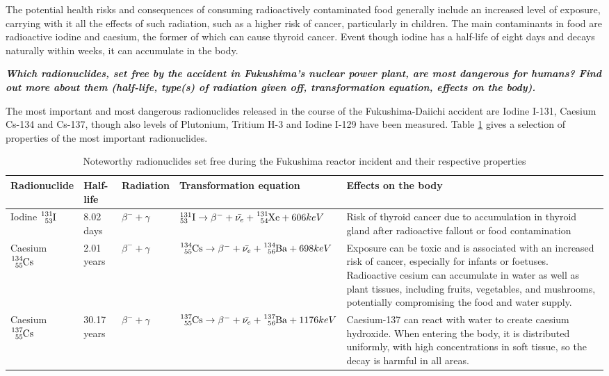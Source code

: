 The potential health risks and consequences of consuming radioactively contaminated food generally include an increased level of exposure, carrying with it all the effects of such radiation, such as a higher risk of cancer, particularly in children. The main contaminants in food are radioactive iodine and caesium, the former of which can cause thyroid cancer. Event though iodine has a half-life of eight days and decays naturally within weeks, it can accumulate in the body. 

\pagebreak

\textbf{\emph{Which radionuclides, set free by the accident in Fukushima's nuclear power plant, are most dangerous for humans? Find out more about them (half-life, type(s) of radiation given off, transformation equation, effects on the body).}}

The most important and most dangerous radionuclides released in the course of the Fukushima-Daiichi accident are Iodine I-131, Caesium Cs-134 and Cs-137, though also levels of Plutonium, Tritium H-3 and Iodine I-129 have been measured. Table \ref{tbl:nuclides} gives a selection of properties of the most important radionuclides.

\begin{table}[b!]
\centering
	\begin{tabular}{| p{2.5cm} | l | p{2cm} | p{3cm} | p{4cm} |}
		\hline 
		\rowcolor[gray]{0.8}
		Radionuclide & Half-life & Radiation & Transformation equation & Effects on the body
		\\ \hline
		Iodine $\ce{^{131}_{53}I}$ & 8.02 days & $\beta^- + \gamma$ & ${^{131}_{53}\ce{I}} \rightarrow \beta^- + \bar{\nu_e} + \ce{^{131}_{54}Xe}  + 606 keV$ & Risk of thyroid cancer due to accumulation in thyroid gland after radioactive fallout or food contamination
		\\ \hline
		Caesium $\ce{^{134}_{55}Cs}$ & 2.01 years & $\beta^- + \gamma$ & $ \ce{^{134}_{55}Cs} \rightarrow \beta^- + \bar{\nu_{e}} + \ce{^{134}_{56}Ba} + 698 keV$ & Exposure can be toxic and is associated with an increased risk of cancer, especially for infants or foetuses. Radioactive cesium can accumulate in water as well as plant tissues, including fruits, vegetables, and mushrooms, potentially compromising the food and water supply.
		\\ \hline
		Caesium $\ce{^{137}_{55}Cs}$ & 30.17 years & $\beta^- + \gamma$& $\ce{^{137}_{55}Cs} \rightarrow \beta^- + \bar{\nu_{e}} + \ce{^137_{56}Ba} + 1176 keV$ & Caesium-137 can react with water to create caesium hydroxide. When entering the body, it is distributed uniformly, with high concentrations in soft tissue, so the decay is harmful in all areas.
		\\ \hline
	\end{tabular}
\caption{Noteworthy radionuclides set free during the Fukushima reactor incident and their respective properties}
\label{tbl:nuclides}
\end{table}

